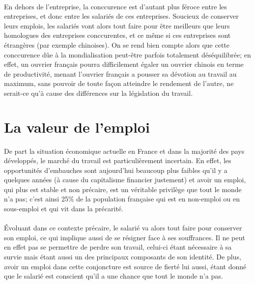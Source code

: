 \documentclass{report}
\begin{document}
		\paragraph{}
			En dehors de l'entreprise, la conccurence est d'autant plus féroce entre les entreprises, et donc entre les salariés de ces entreprises. Soucieux de conserver leurs emplois, les salariés vont alors tout faire pour être meilleurs que leurs homologues des entreprises conccurentes, et ce même si ces entreprises sont étrangères (par exemple chinoises). On se rend bien compte alors que cette conccurence dûe à la mondialisation peut-être parfois totalement déséquilibrée; en effet, un ouvrier français pourra difficilement égaler un ouvrier chinois en terme de productivité, menant l'ouvrier français a pousser sa dévotion au travail au maximum, sans pouvoir de toute façon atteindre le rendement de l'autre, ne serait-ce qu'à cause des différences sur la législation du travail.
	\section{La valeur de l'emploi}
		\paragraph{}
			De part la situation économique actuelle en France et dans la majorité des pays développés, le marché du travail est particulièrement incertain. En effet, les opportunités d'embauches sont aujourd'hui beaucoup plus faibles qu'il y a quelques années (à cause du capitalisme financier justement) et avoir un emploi, qui plus est stable et non précaire, est un véritable privilège que tout le monde n'a pas; c'est ainsi 25\% de la population française qui est en non-emploi ou en sous-emploi et qui vit dans la précarité.
		\paragraph{}
			Évoluant dans ce contexte précaire, le salarié va alors tout faire pour conserver son emploi, ce qui implique aussi de se résigner face à ses souffrances. Il ne peut en effet pas se permettre de perdre son travail, celui-ci étant nécessaire à sa survie mais étant aussi un des principaux composants de son identité. De plus, avoir un emploi dans cette conjoncture est source de fierté lui aussi, étant donné que le salarié est conscient qu'il a une chance que tout le monde n'a pas.
	\newpage{}
\end{document}
